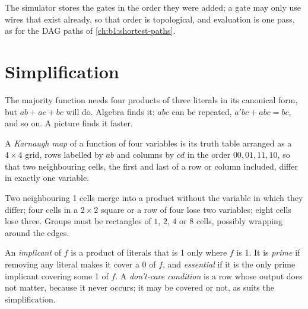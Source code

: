 The simulator stores the gates in the order they were added; a gate may only use wires that exist already, so that
order is topological, and evaluation is one pass, as for the DAG paths of \cref{ch:b1:shortest-paths}.

\label{lst:b1:combinational-circuits:circuit}

\section{Simplification}\label{sec:b1:combinational-circuits:simplification}

The majority function needs four products of three literals in its canonical form, but $ab + ac + bc$ will do. Algebra
finds it: $abc$ can be repeated, $a'bc + abc = bc$, and so on. A picture finds it faster.

\begin{definition}\label{def:b1:combinational-circuits:karnaugh}
A \emph{Karnaugh map} of a function of four variables is its truth table arranged as a $4 \times 4$
grid, rows labelled by $ab$ and columns by $cd$ in the order $00, 01, 11, 10$, so that two neighbouring cells, the
first and last of a row or column included, differ in exactly one variable.
\end{definition}

Two neighbouring 1 cells merge into a product without the variable in which they differ; four cells in a $2 \times 2$
square or a row of four lose two variables; eight cells lose three. Groups must be rectangles of $1$, $2$, $4$ or $8$
cells, possibly wrapping around the edges.

\begin{definition}\label{def:b1:combinational-circuits:implicant}
An \emph{implicant} of $f$ is a product of literals that is 1 only where $f$ is 1. It is
\emph{prime} if removing any literal makes it cover a 0 of $f$, and \emph{essential} if it is the only prime implicant covering some 1 of $f$. A \emph{don't-care
condition} is a row whose output does not matter, because it never occurs; it may be
covered or not, as suits the simplification.
\end{definition}

